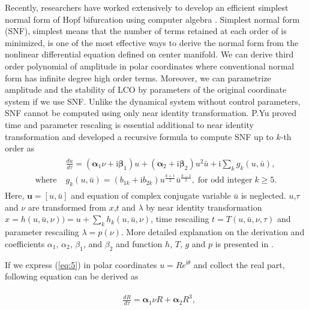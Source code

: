 \documentclass[openacc]{rsproca_new}%
\def\vec#1{\ensuremath{\mathbf{#1}}}
\newcommand{\Eref}[1]{(\ref{#1})}
\begin{document}
Recently, researchers have worked extensively to develop an efficient simplest normal form of Hopf bifurcation using computer algebra \cite{yu1998computation}. Simplest normal form (SNF), simplest means that the number of terms retained at each order of is minimized, is one of the most effective ways to derive the normal form from the nonlinear differential equation defined on center manifold. We can derive third order polynomial of amplitude in polar coordinates where conventional normal form has infinite degree high order terms. Moreover, we can parametrize amplitude and the stability of LCO by parameters of the original coordinate system if we use SNF. Unlike the dynamical system without control parameters, SNF cannot be computed using only near identity transformation. P.Yu \cite{yu2002simplest} proved time and parameter rescaling is essential additional to near identity transformation and developed a recursive formula to compute SNF up to $k$-th order as
\begin{align}\label{eq:5}
  \begin{split}
    &\frac{du}{d\tau}=(\vec{\alpha}_1 \nu+\textrm{i}\vec{\beta}_1) u+(\vec{\alpha}_2+\textrm{i}\vec{\beta}_2) u^2 \bar{u}+\textrm{i}\sum_k g_k(u,\bar{u}),\\
    \textrm{where} \;  &g_k(u,\bar{u})=(b_{1k}+\textrm{i}b_{2k})u^{\frac{k+1}{2}}\bar{u}^{\frac{k-1}{2}}, \; \textrm{for odd integer} \;k \geq 5.
  \end{split}
\end{align}
Here, \(\vec{u}=[u,\bar{u}]\) and equation of complex conjugate variable \(\bar{u}\) is neglected. \(u\),\(\tau\) and \(\nu\) are transformed from \(x\),\(t\) and \(\lambda\) by near identity transformation
\(x=h(u,\bar{u},\nu))=u+\sum_k h_k(u,\bar{u},\nu)\), time rescailing \(t=T(u,\bar{u},\nu,\tau)\) and parameter rescailing \(\lambda=p(\nu)\). More detailed explanation on the derivation and coefficients $\alpha_1$, $\alpha_2$, $\beta_1$, and $\beta_2$ and function $h$, $T$, $g$ and $p$ is presented in \cite{yu2002simplest}.

If we express \Eref{eq:5} in polar coordinates $u=Re^{\textrm{i}\theta}$ and collect the real part, following equation can be derived as

\begin{align}\label{eq:polar}
  \begin{split}
    &\frac{dR}{d\tau}=\vec{\alpha}_1 \nu R+\vec{\alpha}_2 R^3,
  \end{split}
\end{align}
\end{document}
